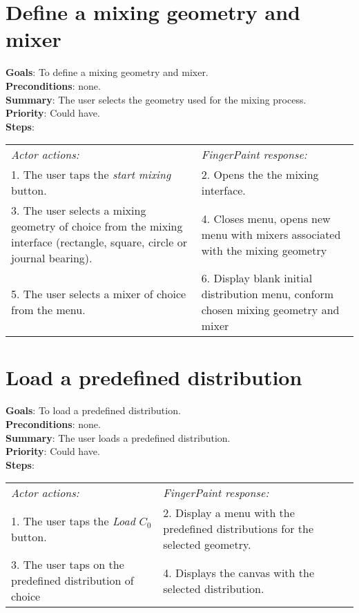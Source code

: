 \begin{appendices}
\section{Define a mixing geometry and mixer}
  \label{geomixer}
  \textbf{Goals}: To define a mixing geometry and mixer.\\
  \textbf{Preconditions}: none.\\
  \textbf{Summary}: The user selects the geometry used for the mixing process.\\
  \textbf{Priority}: Could have.\\
  \textbf{Steps}: \\
  \begin{tabular}{ p{} p{} }
  	\emph{Actor actions:} & \emph{FingerPaint response:} \\
	1. The user taps the \emph{start mixing} button. & 2. Opens the the mixing interface. \\
	3. The user selects a mixing geometry of choice from the mixing interface (rectangle, square, circle or journal bearing). & 4. Closes menu, opens new menu with mixers associated with the mixing geometry\\
	5. The user selects a mixer of choice from the menu. & 6.	Display blank initial distribution menu, conform chosen mixing geometry and mixer\\
  \end{tabular}

  \section{Load a predefined distribution}
  \label{loadpreddist}
  \textbf{Goals}: To load a predefined distribution.\\
  \textbf{Preconditions}: none.\\
  \textbf{Summary}: The user loads a predefined distribution.\\
  \textbf{Priority}: Could have.\\
  \textbf{Steps}: \\
  \begin{tabular}{ p{} p{} }
  	\emph{Actor actions:} & \emph{FingerPaint response:} \\
	1. The user taps the \emph{Load $C_0$} button. & 2. Display a menu with the predefined distributions for the selected geometry. \\
	3. The user taps on the predefined distribution of choice & 4.	Displays the canvas with the selected distribution. \\
  \end{tabular}


\end{appendices}
